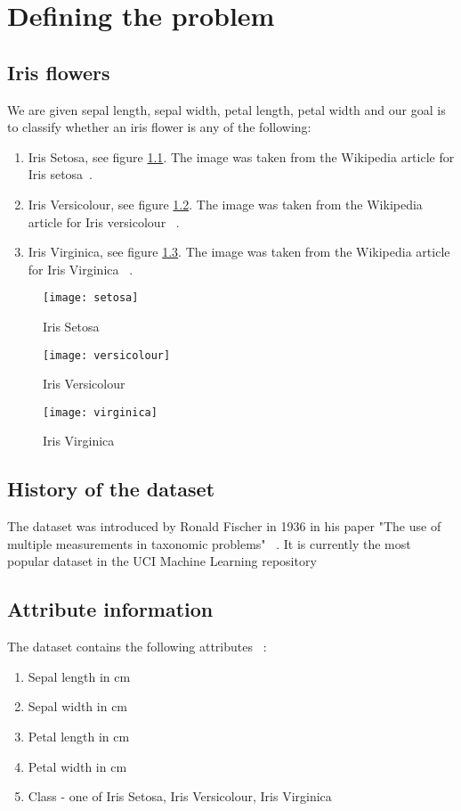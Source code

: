 \chapter{Defining the problem}

\section{Iris flowers}
We are given sepal length, sepal width, petal length, petal width and our goal is to classify whether an iris flower is any of the following:

\begin{enumerate}
    \item Iris Setosa, see figure \ref{fig:setosa}. The image was taken from the Wikipedia article for Iris setosa~\cite{setosa}.
    \item Iris Versicolour, see figure \ref{fig:versicolour}. The image was taken from the Wikipedia article for Iris versicolour ~\cite{versicolor}.
    \item Iris Virginica, see figure \ref{fig:virginica}. The image was taken from the Wikipedia article for Iris Virginica ~\cite{virginica}.
\end{enumerate}
\begin{figure}
    \centering
    \texttt{[image: setosa]}
    \caption{Iris Setosa}
    \label{fig:setosa}
\end{figure}
\begin{figure}
    \centering
    \texttt{[image: versicolour]}
    \caption{Iris Versicolour}
    \label{fig:versicolour}
\end{figure}
\begin{figure}
    \centering
    \texttt{[image: virginica]}
    \caption{Iris Virginica}
    \label{fig:virginica}
\end{figure}

\section{History of the dataset}
The dataset was introduced by Ronald Fischer in 1936 in his paper "The use of multiple measurements in taxonomic problems" ~\cite{setosa}. It is currently the most popular dataset in the UCI Machine Learning repository ~\cite{uci}
\section{Attribute information}
The dataset contains the following attributes ~\cite{iris}:
\begin{enumerate}
    \item Sepal length in cm
    \item Sepal width in cm 
    \item Petal length in cm 
    \item Petal width in cm
    \item Class - one of Iris Setosa, Iris Versicolour, Iris Virginica
\end{enumerate}

